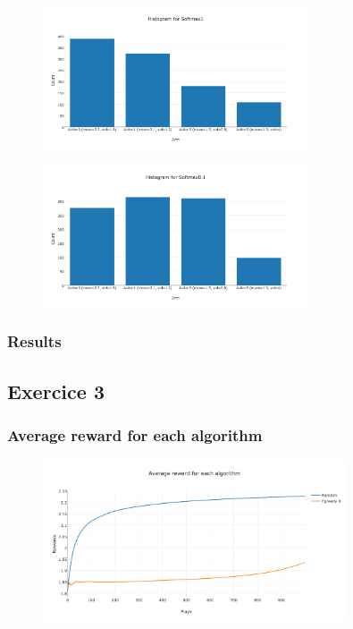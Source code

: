 \documentclass[11pt]{article}
\begin{document}
\begin{figure}[H]
   \centering
   \includegraphics[width=0.7\textwidth]{img/1-2/h5.png}
\end{figure}

\begin{figure}[H]
   \centering
   \includegraphics[width=0.7\textwidth]{img/1-2/h6.png}
\end{figure}


\subsubsection{Results}

\subsection{Exercice 3}


\subsubsection{Average reward for each algorithm}

\begin{figure}[H]
   \centering
   \includegraphics[width=0.8\textwidth]{img/1-3/reward.png}
\end{figure}
\end{document}

